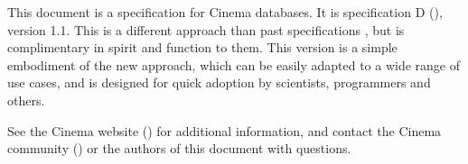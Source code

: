 This document is a specification for Cinema databases. It is specification D
(\dietrich), version 1.1. This is a different approach than past specifications
\cite{cinemaSpecA}\cite{cinemaSpecC}, but is complimentary in spirit and
function to them. This version is a simple embodiment of the new approach,
which can be easily adapted to a wide range of use cases, and is designed for
quick adoption by scientists, programmers and others.

See the Cinema website (\cinemawebsite) for additional information, and contact
the Cinema community (\cinemaemail) or the authors of this document with
questions.
